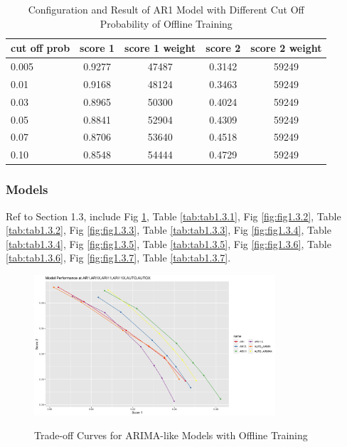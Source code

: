 \documentclass{article}
\begin{document}
\begin{table}[htbp]
  \begin{center}
    \caption{Configuration and Result of AR1 Model with Different Cut Off Probability of Offline Training}
    \label{tab:tab1.2.1}
    \begin{tabular}{l|*{4}{c}} \textbf{cut off prob} & \textbf{score 1} &
      \textbf{score 1 weight} & \textbf{score 2} & \textbf{score 2 weight} \\
      \hline
      0.005 & 0.9277 & 47487 & 0.3142 & 59249\\
      0.01 & 0.9168 & 48124 & 0.3463 & 59249\\
      0.03 & 0.8965 & 50300 & 0.4024 & 59249\\
      0.05 & 0.8841 & 52904 & 0.4309 & 59249\\
      0.07 & 0.8706 & 53640 & 0.4518 & 59249\\
      0.10 & 0.8548 & 54444 & 0.4729 & 59249\\
    \end{tabular}
  \end{center}
\end{table}


\subsubsection{Models}
Ref to Section 1.3, include Fig \ref{fig:fig1.3.1}, Table \ref{tab:tab1.3.1},
Fig \ref{fig:fig1.3.2}, Table \ref{tab:tab1.3.2}, Fig \ref{fig:fig1.3.3}, Table
\ref{tab:tab1.3.3}, Fig \ref{fig:fig1.3.4}, Table \ref{tab:tab1.3.4}, Fig
\ref{fig:fig1.3.5}, Table \ref{tab:tab1.3.5}, Fig \ref{fig:fig1.3.6}, Table
\ref{tab:tab1.3.6}, Fig \ref{fig:fig1.3.7}, Table \ref{tab:tab1.3.7}.

\begin{figure}[htbp]
    \caption{Trade-off Curves for ARIMA-like Models with Offline Training}
    \centering
    \includegraphics[width = 0.8\textwidth]{images/ModelPerformanceatAR1,AR1X,ARI11,ARI11X,AUTO,AUTOX.png}
    \label{fig:fig1.3.1}
\end{figure}
\end{document}
